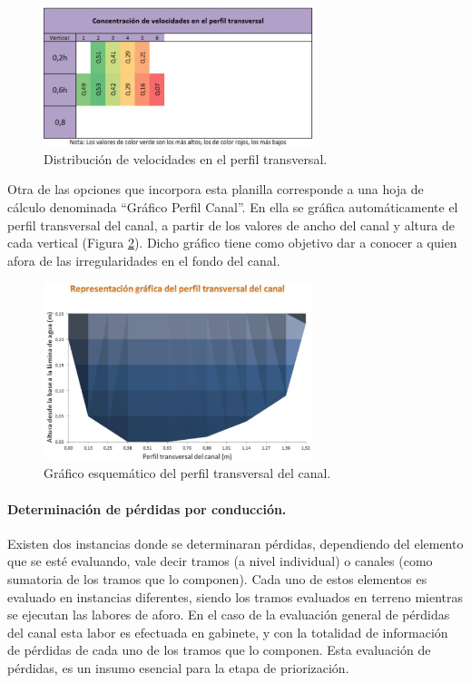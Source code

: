 \documentclass[]{article}
\begin{document}
\begin{figure}[h]
\centering
\includegraphics[width=0.7\textwidth]{images/perfil_tran.eps}
\caption{Distribución de velocidades en el perfil transversal.}
\label{dist_veloc}
\end{figure}

Otra de las opciones que incorpora esta planilla corresponde  a una hoja de cálculo denominada “Gráfico Perfil Canal”. En ella se gráfica automáticamente el perfil transversal del canal, a partir de los valores de ancho del canal y altura de cada vertical (Figura \ref{graf_esq}). Dicho gráfico tiene como objetivo dar a conocer a quien afora de las irregularidades en el fondo del canal.

\begin{figure}[h]
\centering
\includegraphics[width=0.7\textwidth]{images/grafico_esquematico.eps}
\caption{Gráfico esquemático del perfil transversal del canal.}
\label{graf_esq}
\end{figure}

\paragraph{Determinación de pérdidas por conducción.}

Existen dos instancias donde se determinaran pérdidas, dependiendo del elemento que se esté evaluando, vale decir tramos (a nivel individual) o canales (como sumatoria de los tramos que lo componen). Cada uno de estos elementos es evaluado en instancias diferentes, siendo los tramos evaluados en terreno mientras se ejecutan las labores de aforo. En el caso de la evaluación general de pérdidas del canal esta labor es efectuada en gabinete, y con la totalidad de información de pérdidas de cada uno de los tramos que lo componen. Esta evaluación de pérdidas, es un insumo esencial para la etapa de priorización.
\end{document}
